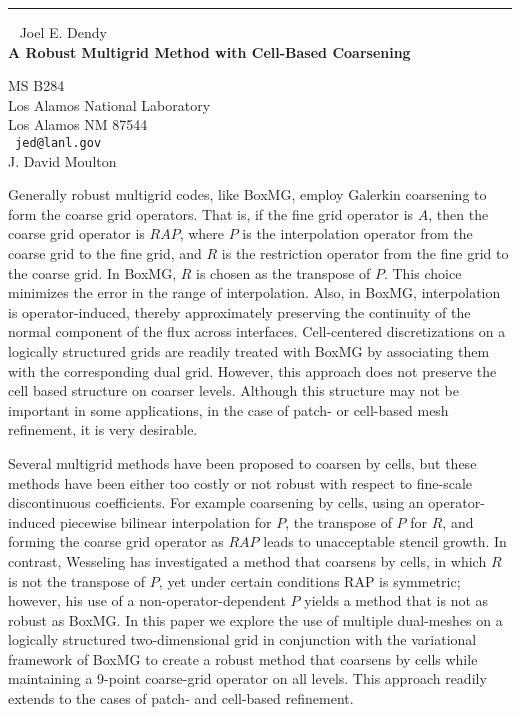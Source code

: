 \documentclass{report}
\begin{document}
\begin{center}

\rule{6in}{1pt} \
{\large
Joel E. Dendy
\\ {\bf
A Robust Multigrid Method with Cell-Based Coarsening
}}

MS B284
\\
Los Alamos National Laboratory
\\
Los Alamos NM 87544
\\ {\tt
jed@lanl.gov
}
\\
J. David Moulton
\end{center}

Generally robust multigrid codes, like BoxMG, employ Galerkin
coarsening to form the coarse grid operators. That is, if the fine
grid operator is $A$, then the coarse grid operator is $RAP$, where
$P$ is the interpolation operator from the coarse grid to the fine
grid, and $R$ is the restriction operator from the fine grid to the
coarse grid. In BoxMG, $R$ is chosen as the transpose of $P$. This choice
minimizes the error in the range of interpolation. Also, in BoxMG,
interpolation is operator-induced, thereby approximately preserving
the continuity of the normal component of the flux across interfaces.
Cell-centered discretizations on a logically structured grids are
readily treated with BoxMG by associating them with the corresponding
dual grid. However, this approach does not preserve the cell based
structure on coarser levels. Although this structure may not be
important in some applications, in the case of patch- or cell-based
mesh refinement, it is very desirable.

Several multigrid methods have
been proposed to coarsen by cells, but these methods have been either
too costly or not robust with respect to fine-scale discontinuous
coefficients. For example coarsening by cells, using an
operator-induced piecewise bilinear interpolation for $P$, the transpose
of $P$ for $R$, and forming the coarse grid operator as $RAP$ leads to
unacceptable stencil growth. In contrast, Wesseling has investigated a
method that coarsens by cells, in which $R$ is not the transpose of $P$,
yet under certain conditions RAP is symmetric; however, his use of a
non-operator-dependent $P$ yields a method that is not as robust as
BoxMG. In this paper we explore the use of multiple dual-meshes on a
logically structured two-dimensional grid in conjunction with the
variational framework of BoxMG to create a robust method that coarsens
by cells while maintaining a 9-point coarse-grid operator on all
levels. This approach readily extends to the cases of patch- and
cell-based refinement.
\end{document}

